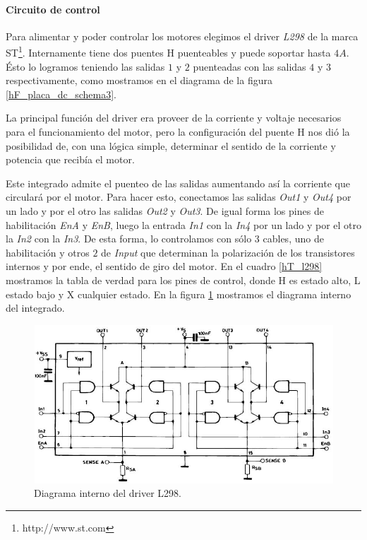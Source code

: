 \paragraph{Circuito de control}
\label{h_actuadores_motorDC_circuito}

Para alimentar y poder controlar los motores elegimos el driver \emph{L298} de la marca ST\footnote{http://www.st.com}.
Internamente tiene dos puentes H puenteables y puede soportar hasta $4 A$.
\'Esto lo logramos teniendo las salidas $1$ y $2$ puenteadas con las salidas $4$ y $3$ respectivamente, como
mostramos en el diagrama de la figura \ref{hF_placa_dc_schema3}.

La principal funci\'on del driver era proveer de la corriente y voltaje necesarios para el funcionamiento del motor, pero la configuraci\'on
del puente H nos di\'o la posibilidad de, con una l\'ogica simple, determinar el sentido de la corriente y potencia que recib\'ia el motor.

Este integrado admite el puenteo de las salidas aumentando as\'i la corriente que circular\'a por el motor.
Para hacer esto, conectamos las salidas \emph{Out1} y \emph{Out4} por un lado y por el otro las salidas \emph{Out2} y \emph{Out3}.
De igual forma los pines de habilitaci\'on \emph{EnA} y \emph{EnB}, luego la entrada \emph{In1} con la \emph{In4} por un lado y
por el otro la \emph{In2} con la \emph{In3}.
De esta forma, lo controlamos con s\'olo $3$ cables, uno de habilitaci\'on y otros $2$ de \emph{Input} que determinan
la polarizaci\'on de los transistores internos y por ende, el sentido de giro del motor.
En el cuadro \ref{hT_l298} mostramos la tabla de verdad para los pines de control, donde H es estado alto, L estado bajo y X cualquier estado.
En la figura \ref{hF_l298} mostramos el diagrama interno del integrado.

\begin{figure}[h]
	\centering
	\includegraphics[scale=0.40]{figuras/L298.png}
	\caption{Diagrama interno del driver L298.}
	\label{hF_l298}
\end{figure}

